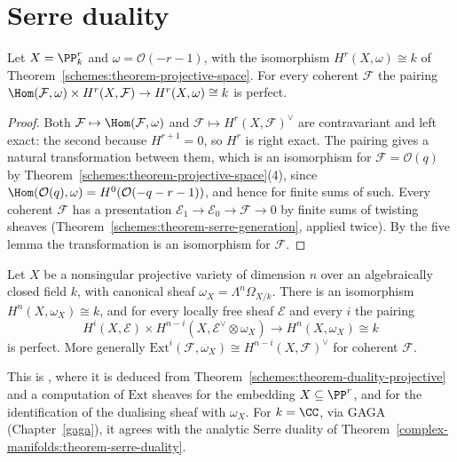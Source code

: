 \section{Serre duality}\label{schemes:section-serre-duality}

\begin{theorem}\label{schemes:theorem-duality-projective}
Let $X = \PP^r_k$ and $\omega = \mathcal{O}(-r-1)$, with the isomorphism $H^r(X, \omega) \cong k$ of Theorem~\ref{schemes:theorem-projective-space}. For every coherent
$\mathcal{F}$ the pairing $\Hom(\mathcal{F}, \omega) \times H^r(X, \mathcal{F}) \to H^r(X, \omega) \cong k$ is perfect.
\end{theorem}

\begin{proof}
Both $\mathcal{F} \mapsto \Hom(\mathcal{F}, \omega)$ and $\mathcal{F} \mapsto H^r(X, \mathcal{F})^\vee$ are contravariant and left exact: the second because $H^{r+1} = 0$, so $H^r$ is right exact.
The pairing gives a natural transformation between them, which is an isomorphism for $\mathcal{F} = \mathcal{O}(q)$ by
Theorem~\ref{schemes:theorem-projective-space}(4), since $\Hom(\mathcal{O}(q), \omega) = H^0(\mathcal{O}(-q-r-1))$, and hence for finite sums of such.
Every coherent $\mathcal{F}$ has a presentation $\mathcal{E}_1 \to \mathcal{E}_0 \to \mathcal{F} \to 0$ by finite sums of twisting sheaves
(Theorem~\ref{schemes:theorem-serre-generation}, applied twice). By the five lemma the transformation is an isomorphism for $\mathcal{F}$.
\end{proof}

\begin{theorem}\label{schemes:theorem-serre-duality}
Let $X$ be a nonsingular projective variety of dimension $n$ over an algebraically closed field $k$, with canonical sheaf $\omega_X = \Lambda^n\Omega_{X/k}$. There is an
isomorphism $H^n(X, \omega_X) \cong k$, and for every locally free sheaf $\mathcal{E}$ and every $i$ the pairing
\[
H^i(X, \mathcal{E}) \times H^{n-i}(X, \mathcal{E}^\vee \otimes \omega_X) \to H^n(X, \omega_X) \cong k
\]
is perfect. More generally $\mathrm{Ext}^i(\mathcal{F}, \omega_X) \cong H^{n-i}(X, \mathcal{F})^\vee$ for coherent $\mathcal{F}$.
\end{theorem}

This is \cite[Theorem III.7.6 and Corollary III.7.7]{hartshorne-ag}, where it is deduced from Theorem~\ref{schemes:theorem-duality-projective} and a computation of
$\mathrm{Ext}$ sheaves for the embedding $X \subseteq \PP^r$, and \cite[Corollary III.7.12]{hartshorne-ag} for the identification of the dualising sheaf with $\omega_X$. For
$k = \CC$, via GAGA (Chapter~\ref{gaga}), it agrees with the analytic Serre duality of Theorem~\ref{complex-manifolds:theorem-serre-duality}.

